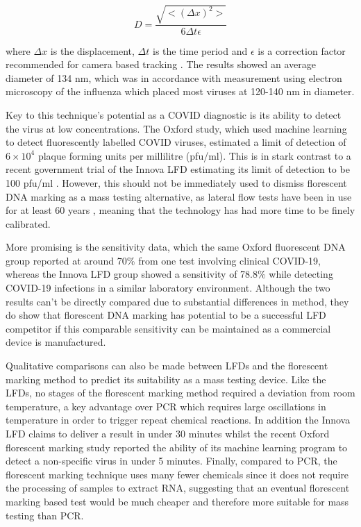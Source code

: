 \documentclass[11pt]{report}
\begin{document}
\begin{equation}
    D=\frac{\sqrt{<(\Delta{}x)^{2}>}}{6\Delta{}t\epsilon}
\end{equation}

where $\Delta{}x$ is the displacement, $\Delta{}t$ is the time period and $\epsilon$ is a correction factor recommended for camera based tracking \cite{testing7}. The results showed an average diameter of 134 nm, which was in accordance with measurement using electron microscopy of the influenza which placed most viruses at 120-140 nm in diameter.

Key to this technique’s potential as a COVID diagnostic is its ability to detect the virus at low concentrations. The Oxford study, which used machine learning to detect fluorescently labelled COVID viruses, estimated a limit of detection of $6\times{}10^{4}$ plaque forming units per millilitre (pfu/ml). This is in stark contrast to a recent government trial of the Innova LFD estimating its limit of detection to be 100 pfu/ml \cite{testing8}. However, this should not be immediately used to dismiss florescent DNA marking as a mass testing alternative, as lateral flow tests have been in use for at least 60 years \cite{testing9}, meaning that the technology has had more time to be finely calibrated.

More promising is the sensitivity data, which the same Oxford fluorescent DNA group reported at around 70\% from one test involving clinical COVID-19, whereas the Innova LFD group showed a sensitivity of 78.8\% while detecting COVID-19 infections in a similar laboratory environment. Although the two results can’t be directly compared due to substantial differences in method, they do show that florescent DNA marking has potential to be a successful LFD competitor if this comparable sensitivity can be maintained as a commercial device is manufactured.

Qualitative comparisons can also be made between LFDs and the florescent marking method to predict its suitability as a mass testing device. Like the LFDs, no stages of the florescent marking method required a deviation from room temperature, a key advantage over PCR which requires large oscillations in temperature in order to trigger repeat chemical reactions. In addition the Innova LFD claims to deliver a result in under 30 minutes whilst the recent Oxford florescent marking study reported the ability of its machine learning program to detect a non-specific virus in under 5 minutes. Finally, compared to PCR, the florescent marking technique uses many fewer chemicals since it does not require the processing of samples to extract RNA, suggesting that an eventual florescent marking based test would be much cheaper and therefore more suitable for mass testing than PCR.
\end{document}
